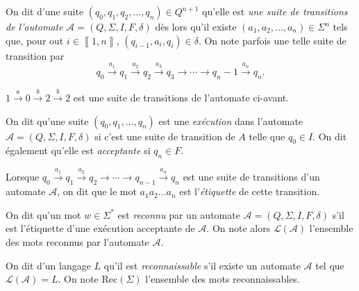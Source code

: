 \begin{defn}
	On dit d'une suite $(q_0, q_1, q_2, \ldots, q_n) \in Q^{n+1}$\/ qu'elle est {\it une suite de transitions de l'automate}\/ $\mathcal{A} = (Q, \Sigma, I, F, \delta)$\/ dès lors qu'il existe $(a_1, a_2, \ldots, a_n) \in \Sigma^n$\/ tels que, pour out $i \in \left\llbracket 1,n \right\rrbracket$, $(q_{i-1}, a_i, q_i) \in \delta$. On note parfois une telle suite de transition par \[
		q_0 \xrightarrow{a_1} q_1 \xrightarrow{a_2} q_2 \xrightarrow{a_3} q_3 \to \cdots \to q_n-1\xrightarrow{a_n} q_n
	.\]
\end{defn}

\begin{exm}
	$1 \xrightarrow a 0 \xrightarrow b 2 \xrightarrow b 2$ est une suite de transitions de l'automate ci-avant.
\end{exm}

\begin{defn}
	On dit qu'une suite $(q_0, q_1, \ldots, q_n)$\/ est une {\it exécution}\/ dans l'automate $\mathcal{A} = (Q, \Sigma, I, F, \delta)$\/ si c'est une suite de transition de $A$\/ telle que $q_0 \in I$.
	On dit également qu'elle est {\it acceptante}\/ si $q_n \in F$.

	Lorsque $q_0 \xrightarrow{a_1} q_1 \xrightarrow{a_2} q_2 \to \cdots \to q_{n-1} \xrightarrow{a_n} q_n$\/ est une suite de transitions d'un automate $\mathcal{A}$, on dit que le mot $a_1a_2\ldots a_n$\/ est l'{\it étiquette}\/ de cette transition.
\end{defn}

\begin{defn}
	On dit qu'un mot $w \in \Sigma^*$\/ est {\it reconnu}\/ par un automate $\mathcal{A} = (Q, \Sigma, I, F, \delta)$\/ s'il est l'étiquette d'une exécution acceptante de $\mathcal{A}$.
	On note alors $\mathcal{L}(\mathcal{A})$\/ l'ensemble des mots reconnus par l'automate $\mathcal{A}$.
\end{defn}

\begin{defn}
	On dit d'un langage $L$\/ qu'il est {\it reconnaissable}\/ s'il existe un automate $\mathcal{A}$\/ tel que $\mathcal{L}(\mathcal{A}) = L$. On note $\mathrm{Rec}(\Sigma)$\/ l'ensemble des mots reconnaissables.
\end{defn}


